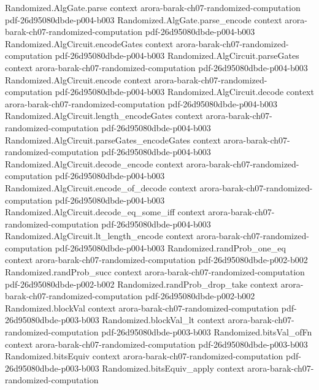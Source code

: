 \begin{theorem}
\proofstep
  {Randomized.AlgGate.parse}
  {context}
  {arora-barak-ch07-randomized-computation}
  {pdf-26d95080dbde-p004-b003}
\proofstep
  {Randomized.AlgGate.parse_encode}
  {context}
  {arora-barak-ch07-randomized-computation}
  {pdf-26d95080dbde-p004-b003}
\proofstep
  {Randomized.AlgCircuit.encodeGates}
  {context}
  {arora-barak-ch07-randomized-computation}
  {pdf-26d95080dbde-p004-b003}
\proofstep
  {Randomized.AlgCircuit.parseGates}
  {context}
  {arora-barak-ch07-randomized-computation}
  {pdf-26d95080dbde-p004-b003}
\proofstep
  {Randomized.AlgCircuit.encode}
  {context}
  {arora-barak-ch07-randomized-computation}
  {pdf-26d95080dbde-p004-b003}
\proofstep
  {Randomized.AlgCircuit.decode}
  {context}
  {arora-barak-ch07-randomized-computation}
  {pdf-26d95080dbde-p004-b003}
\proofstep
  {Randomized.AlgCircuit.length_encodeGates}
  {context}
  {arora-barak-ch07-randomized-computation}
  {pdf-26d95080dbde-p004-b003}
\proofstep
  {Randomized.AlgCircuit.parseGates_encodeGates}
  {context}
  {arora-barak-ch07-randomized-computation}
  {pdf-26d95080dbde-p004-b003}
\proofstep
  {Randomized.AlgCircuit.decode_encode}
  {context}
  {arora-barak-ch07-randomized-computation}
  {pdf-26d95080dbde-p004-b003}
\proofstep
  {Randomized.AlgCircuit.encode_of_decode}
  {context}
  {arora-barak-ch07-randomized-computation}
  {pdf-26d95080dbde-p004-b003}
\proofstep
  {Randomized.AlgCircuit.decode_eq_some_iff}
  {context}
  {arora-barak-ch07-randomized-computation}
  {pdf-26d95080dbde-p004-b003}
\proofstep
  {Randomized.AlgCircuit.lt_length_encode}
  {context}
  {arora-barak-ch07-randomized-computation}
  {pdf-26d95080dbde-p004-b003}
\proofstep
  {Randomized.randProb_one_eq}
  {context}
  {arora-barak-ch07-randomized-computation}
  {pdf-26d95080dbde-p002-b002}
\proofstep
  {Randomized.randProb_succ}
  {context}
  {arora-barak-ch07-randomized-computation}
  {pdf-26d95080dbde-p002-b002}
\proofstep
  {Randomized.randProb_drop_take}
  {context}
  {arora-barak-ch07-randomized-computation}
  {pdf-26d95080dbde-p002-b002}
\proofstep
  {Randomized.blockVal}
  {context}
  {arora-barak-ch07-randomized-computation}
  {pdf-26d95080dbde-p003-b003}
\proofstep
  {Randomized.blockVal_lt}
  {context}
  {arora-barak-ch07-randomized-computation}
  {pdf-26d95080dbde-p003-b003}
\proofstep
  {Randomized.bitsVal_ofFn}
  {context}
  {arora-barak-ch07-randomized-computation}
  {pdf-26d95080dbde-p003-b003}
\proofstep
  {Randomized.bitsEquiv}
  {context}
  {arora-barak-ch07-randomized-computation}
  {pdf-26d95080dbde-p003-b003}
\proofstep
  {Randomized.bitsEquiv_apply}
  {context}
  {arora-barak-ch07-randomized-computation}

\end{theorem}
